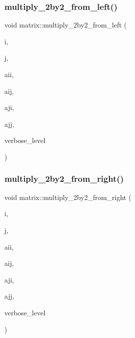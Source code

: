 \subsubsection{\texorpdfstring{multiply\+\_\+2by2\+\_\+from\+\_\+left()}{multiply\_2by2\_from\_left()}}
{\footnotesize\ttfamily void matrix\+::multiply\+\_\+2by2\+\_\+from\+\_\+left (\begin{DoxyParamCaption}\item[{\mbox{\hyperlink{galois_8h_a09fddde158a3a20bd2dcadb609de11dc}{I\+NT}}}]{i,  }\item[{\mbox{\hyperlink{galois_8h_a09fddde158a3a20bd2dcadb609de11dc}{I\+NT}}}]{j,  }\item[{\mbox{\hyperlink{classdiscreta__base}{discreta\+\_\+base}} \&}]{aii,  }\item[{\mbox{\hyperlink{classdiscreta__base}{discreta\+\_\+base}} \&}]{aij,  }\item[{\mbox{\hyperlink{classdiscreta__base}{discreta\+\_\+base}} \&}]{aji,  }\item[{\mbox{\hyperlink{classdiscreta__base}{discreta\+\_\+base}} \&}]{ajj,  }\item[{\mbox{\hyperlink{galois_8h_a09fddde158a3a20bd2dcadb609de11dc}{I\+NT}}}]{verbose\+\_\+level }\end{DoxyParamCaption})}

\mbox{\label{classmatrix_a00455d7848021f33e9c8d280d1c8a0de}} 
\subsubsection{\texorpdfstring{multiply\+\_\+2by2\+\_\+from\+\_\+right()}{multiply\_2by2\_from\_right()}}
{\footnotesize\ttfamily void matrix\+::multiply\+\_\+2by2\+\_\+from\+\_\+right (\begin{DoxyParamCaption}\item[{\mbox{\hyperlink{galois_8h_a09fddde158a3a20bd2dcadb609de11dc}{I\+NT}}}]{i,  }\item[{\mbox{\hyperlink{galois_8h_a09fddde158a3a20bd2dcadb609de11dc}{I\+NT}}}]{j,  }\item[{\mbox{\hyperlink{classdiscreta__base}{discreta\+\_\+base}} \&}]{aii,  }\item[{\mbox{\hyperlink{classdiscreta__base}{discreta\+\_\+base}} \&}]{aij,  }\item[{\mbox{\hyperlink{classdiscreta__base}{discreta\+\_\+base}} \&}]{aji,  }\item[{\mbox{\hyperlink{classdiscreta__base}{discreta\+\_\+base}} \&}]{ajj,  }\item[{\mbox{\hyperlink{galois_8h_a09fddde158a3a20bd2dcadb609de11dc}{I\+NT}}}]{verbose\+\_\+level }\end{DoxyParamCaption})}

